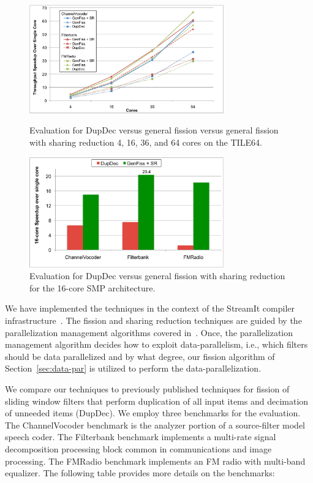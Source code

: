 \begin{figure}[t]
\begin{minipage}[b]{0.5\linewidth}
\centering
\includegraphics[width=3.3in]{figures/tilera-chart.pdf}
\caption{ Evaluation for DupDec versus general fission versus general fission with sharing reduction
  4, 16, 36, and 64 cores on the TILE64.}
\label{fig:tilera-chart}
\end{minipage}
\hspace{0.5cm}
\begin{minipage}[b]{0.5\linewidth}
\centering
\includegraphics[width=3.3in]{figures/smp-chart.pdf}
\caption{Evaluation for DupDec versus general fission with sharing reduction
  for the 16-core SMP architecture. }
\label{fig:smp-chart}
\end{minipage}
\vspace{-10pt}
\end{figure}

We have implemented the techniques in the context of the StreamIt
compiler infrastructure~\cite{gordon-asplos06}.  The fission and
sharing reduction techniques are guided by the parallelization
management algorithms covered in~\cite{gordon-asplos06}.  Once, the
parallelization management algorithm decides how to exploit
data-parallelism, i.e., which filters should be data parallelized and
by what degree, our fission algorithm of Section~\ref{sec:data-par} is
utilized to perform the data-parallelization.

We compare our techniques to previously published techniques for
fission of sliding window filters that perform duplication of all
input items and decimation of unneeded items (DupDec).  We employ
three benchmarks for the evaluation.  The ChannelVocoder benchmark is
the analyzer portion of a source-filter model speech coder.  The
Filterbank benchmark implements a multi-rate signal decomposition
processing block common in communications and image processing.  The
FMRadio benchmark implements an FM radio with multi-band equalizer.
The following table provides more details on the benchmarks:


